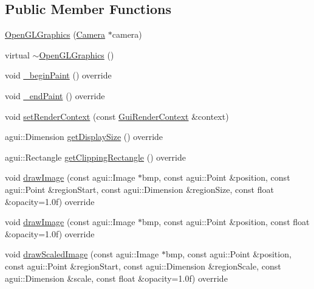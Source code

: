 \subsection*{Public Member Functions}
\begin{DoxyCompactItemize}
\item 
\mbox{\hyperlink{classec_1_1_open_g_l_graphics_a00fc60468c629c36d438a8cbd7515907}{Open\+G\+L\+Graphics}} (\mbox{\hyperlink{classec_1_1_camera}{Camera}} $\ast$camera)
\item 
virtual \mbox{\hyperlink{classec_1_1_open_g_l_graphics_ad0d1809da650499fa9d885eb97d44b0e}{$\sim$\+Open\+G\+L\+Graphics}} ()
\item 
void \mbox{\hyperlink{classec_1_1_open_g_l_graphics_a233cb9eb186c86926f23cbe40973d99b}{\+\_\+begin\+Paint}} () override
\item 
void \mbox{\hyperlink{classec_1_1_open_g_l_graphics_aca816c9b6aecd0f36aa6d1c0cb7b82b6}{\+\_\+end\+Paint}} () override
\item 
void \mbox{\hyperlink{classec_1_1_open_g_l_graphics_a653df9c2f115a9de14ae11d13ff48f70}{set\+Render\+Context}} (const \mbox{\hyperlink{structec_1_1_gui_render_context}{Gui\+Render\+Context}} \&context)
\item 
agui\+::\+Dimension \mbox{\hyperlink{classec_1_1_open_g_l_graphics_afc8287989607af54b43eae71ddcd259e}{get\+Display\+Size}} () override
\item 
agui\+::\+Rectangle \mbox{\hyperlink{classec_1_1_open_g_l_graphics_ab32accb99490952a35fd1cb6a74d3716}{get\+Clipping\+Rectangle}} () override
\item 
void \mbox{\hyperlink{classec_1_1_open_g_l_graphics_a53c23677e5aa747a18d5a3b88a30d539}{draw\+Image}} (const agui\+::\+Image $\ast$bmp, const agui\+::\+Point \&position, const agui\+::\+Point \&region\+Start, const agui\+::\+Dimension \&region\+Size, const float \&opacity=1.\+0f) override
\item 
void \mbox{\hyperlink{classec_1_1_open_g_l_graphics_acaff776ddbeb8d6e33c9044109d28f7a}{draw\+Image}} (const agui\+::\+Image $\ast$bmp, const agui\+::\+Point \&position, const float \&opacity=1.\+0f) override
\item 
void \mbox{\hyperlink{classec_1_1_open_g_l_graphics_aee62c8abe90fd8b17b4730a9c21b9728}{draw\+Scaled\+Image}} (const agui\+::\+Image $\ast$bmp, const agui\+::\+Point \&position, const agui\+::\+Point \&region\+Start, const agui\+::\+Dimension \&region\+Scale, const agui\+::\+Dimension \&scale, const float \&opacity=1.\+0f) override
\item 

\end{DoxyCompactItemize}
